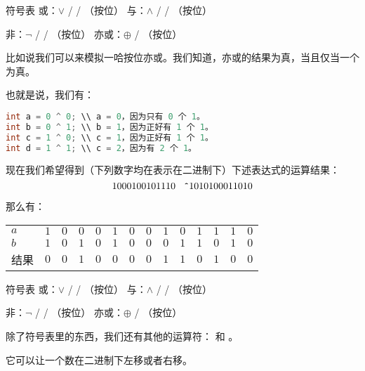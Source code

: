 \begin{frame}[fragile]
\begin{block}{符号表}
或：$\lor$ / \cmd{||} / \cmd{|}（按位）\hfill
与：$\land$ / \cmd{\&\&} / \cmd{\&}（按位）\hfill

非：$\lnot$ / \cmd{!} / \cmd{\ \~}（按位）\hfill
亦或：$\oplus$ / \cmd{\ \^}（按位） \hfill
\end{block}

比如说我们可以来模拟一哈按位亦或。我们知道，亦或的结果为真，当且仅当一个为真。

也就是说，我们有：
\begin{lstlisting}[language=C++]
int a = 0 ^ 0; \\ a = 0，因为只有 0 个 1。
int b = 0 ^ 1; \\ b = 1，因为正好有 1 个 1。
int c = 1 ^ 0; \\ c = 1，因为正好有 1 个 1。
int d = 1 ^ 1; \\ c = 2，因为有 2 个 1。
\end{lstlisting}
\end{frame}

\begin{frame}
现在我们希望得到（下列数字均在表示在二进制下）下述表达式的运算结果：\[
    1000100101110 \text{ \texttt{\ \^}} 1010100011010
\] \pause

那么有：
\begin{center}
\begin{tabular}{lrrrrrrrrrrrrr}
    \toprule
    $a$  & $1$ & $0$ & $0$ & $0$ & $1$ & $0$ & $0$ & $1$ & $0$ & $1$ & $1$ & $1$ & $0$ \\
    $b$  & $1$ & $0$ & $1$ & $0$ & $1$ & $0$ & $0$ & $0$ & $1$ & $1$ & $0$ & $1$ & $0$ \\
    \midrule
    结果 & $0$ & $0$ & $1$ & $0$ & $0$ & $0$ & $0$ & $1$ & $1$ & $0$ & $1$ & $0$ & $0$ \\
    \bottomrule
\end{tabular}
\end{center}
\end{frame}

\begin{frame}
\begin{block}{符号表}
或：$\lor$ / \cmd{||} / \cmd{|}（按位）\hfill
与：$\land$ / \cmd{\&\&} / \cmd{\&}（按位）\hfill

非：$\lnot$ / \cmd{!} / \cmd{\ \~}（按位）\hfill
亦或：$\oplus$ / \cmd{\ \^}（按位） \hfill
\end{block}

除了符号表里的东西，我们还有其他的运算符：\cmd{>>} 和 \cmd{<<}。

它可以让一个数在二进制下左移或者右移。
\end{frame}

